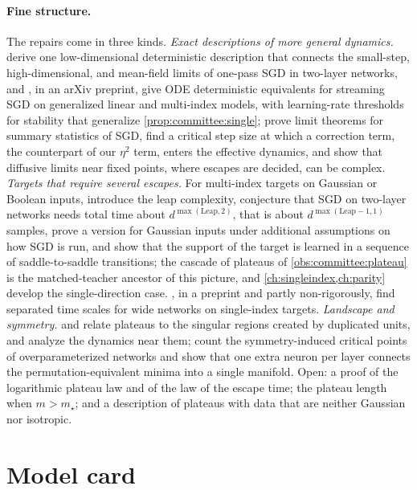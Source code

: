 \begin{refsection}
\paragraph{Fine structure.}
The repairs come in three kinds. \emph{Exact descriptions of more general dynamics.} \textcite{ArnaboldiStephanKrzakalaLoureiro2023} derive one low-dimensional deterministic description that connects the small-step, high-dimensional, and mean-field limits of one-pass SGD in two-layer networks, and \textcite{CollinsWoodfinEtAl2023}, in an arXiv preprint, give ODE deterministic equivalents for streaming SGD on generalized linear and multi-index models, with learning-rate thresholds for stability that generalize \cref{prop:committee:single}; \textcite{BenArousGheissariJagannath2022} prove limit theorems for summary statistics of SGD, find a critical step size at which a correction term, the counterpart of our $\eta^2$ term, enters the effective dynamics, and show that diffusive limits near fixed points, where escapes are decided, can be complex. \emph{Targets that require several escapes.} For multi-index targets on Gaussian or Boolean inputs, \textcite{AbbeBoixAdseraMisiakiewicz2023} introduce the leap complexity, conjecture that SGD on two-layer networks needs total time about $d^{\max(\mathrm{Leap},2)}$, that is about $d^{\max(\mathrm{Leap}-1,1)}$ samples, prove a version for Gaussian inputs under additional assumptions on how SGD is run, and show that the support of the target is learned in a sequence of saddle-to-saddle transitions; the cascade of plateaus of \cref{obs:committee:plateau} is the matched-teacher ancestor of this picture, and \cref{ch:singleindex,ch:parity} develop the single-direction case. \textcite{BerthierMontanariZhou2023}, in a preprint and partly non-rigorously, find separated time scales for wide networks on single-index targets. \emph{Landscape and symmetry.} \textcite{FukumizuAmari2000} and \textcite{AmariParkOzeki2006} relate plateaus to the singular regions created by duplicated units, and \textcite{CousseauOzekiAmari2008} analyze the dynamics near them; \textcite{SimsekEtAl2021} count the symmetry-induced critical points of overparameterized networks and show that one extra neuron per layer connects the permutation-equivalent minima into a single manifold. Open: a proof of the logarithmic plateau law and of the law of the escape time; the plateau length when $m>m_\star$; and a description of plateaus with data that are neither Gaussian nor isotropic.

\section{Model card}\label{sec:committee:card}


\end{refsection}
